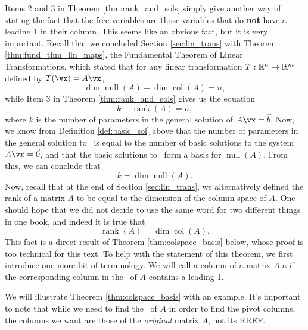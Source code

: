 Items 2 and 3 in Theorem \ref{thm:rank_and_sols} simply give another way of stating the fact that the free variables are those variables that do \textbf{not} have a leading 1 in their column. This seems like an obvious fact, but it is very important. Recall that we concluded Section \ref{sec:lin_trans} with Theorem \ref{thm:fund_thm_lin_maps}, the Fundamental Theorem of Linear Transformations, which stated that for any linear transformation $T:\mathbb{R}^n\to \mathbb{R}^m$ defined by $T(\vx) = A\vx$,
\[
\dim \operatorname{null}(A) + \dim \operatorname{col}(A) = n,
\]
while Item 3 in Theorem \ref{thm:rank_and_sols} gives us the equation
\[
 k + \operatorname{rank}(A) = n,
\]
where $k$ is the number of parameters in the general solution of $A\vx = \vec b$. Now, we know from Definition \ref{def:basic_sol} above that the number of parameters in the general solution to \ttaxb\ is equal to the number of basic solutions to the system $A\vx = \vec 0$, and that the basic solutions to \ttaxo\ form a basis for $\operatorname{null}(A)$. From this, we can conclude that
\[
k = \dim \operatorname{null}(A).
\]
Now, recall that at the end of Section \ref{sec:lin_trans}, we alternatively defined the rank of a matrix $A$ to be equal to the dimension of the column space of $A$. One should hope that we did not decide to use the same word for two different things in one book, and indeed it is true that
\[
\operatorname{rank}(A) = \dim \operatorname{col}(A).
\]
This fact is a direct result of Theorem \ref{thm:colspace_basis} below, whose proof is too technical for this text. To help with the statement of this theorem, we first introduce one more bit of terminology. We will call a column of a matrix $A$ a  if the corresponding column in the \rref\ of $A$ contains a leading 1.

\smallskip


\smallskip

We will illustrate Theorem \ref{thm:colspace_basis} with an example. It's important to note that while we need to find the \rref\ of $A$ in order to find the pivot columns, the columns we want are those of the \textit{original} matrix $A$, not its RREF.

\medskip

